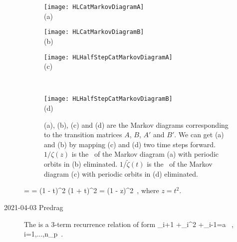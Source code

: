 \begin{description}
\begin{figure}\begin{center}
            \begin{minipage}[c]{0.3\textwidth}\begin{center}
\texttt{[image: HLCatMarkovDiagramA]}\\(a)
            \end{center}\end{minipage}
            \begin{minipage}[c]{0.25\textwidth}\begin{center}
\texttt{[image: HLCatMarkovDiagramB]}\\(b)
            \end{center}\end{minipage}
            \begin{minipage}[c]{0.2\textwidth}\begin{center}
\texttt{[image: HLHalfStepCatMarkovDiagramA]}\\(c)
            \end{center}\end{minipage}
            ~~~
            \begin{minipage}[c]{0.15\textwidth}\begin{center}
\texttt{[image: HLHalfStepCatMarkovDiagramB]}\\(d)
            \end{center}\end{minipage}
\end{center}
  \caption{\label{fig:HLHalfStepMarkov}
(a), (b), (c) and (d) are the Markov diagrams corresponding to the transition
matrices $A$, $B$, $A'$ and $B'$. We can get (a) and (b)
by mapping (c) and (d) two time steps forward. $1/\zeta(z)$ is the \tzeta\ of
the Markov diagram (a) with periodic orbits in (b) eliminated.
$1/\tilde{\zeta}(t)$ is the \tzeta\ of
the Markov diagram (c) with periodic orbits in (d) eliminated.
}
\end{figure}


\beq
{}
    = 
    =  
                  {(1 - t)^2}
        \cdot
                  {(1 + t)^2}
    =  
                  {(1 - z)^2}
\,,
where $z=t^2$.

   \item[2021-04-03 Predrag]
The {\henlatt}
 is a 3-term recurrence relation of form 
\beq
\field_{i+1} +\field_{i}^2 +\field_{i-1}=a  \, ,
\quad i=1,...,n_p
\,.
\label{groups:Henlatt-2-step}
\eeq

\end{description}


